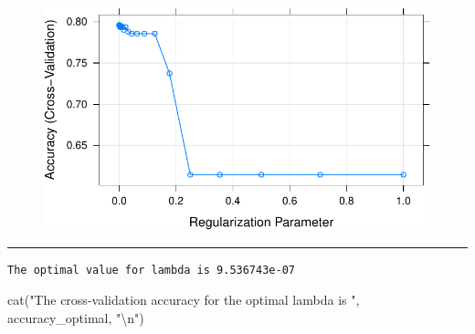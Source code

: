 \documentclass[
  letterpaper,
  DIV=11,
  numbers=noendperiod]{scrartcl}
\newenvironment{Shaded}{\begin{snugshade}}{\end{snugshade}}
\newcommand{\CommentTok}[1]{\textcolor[rgb]{0.37,0.37,0.37}{#1}}
\newcommand{\FunctionTok}[1]{\textcolor[rgb]{0.28,0.35,0.67}{#1}}
\newcommand{\NormalTok}[1]{\textcolor[rgb]{0.00,0.23,0.31}{#1}}
\newcommand{\OtherTok}[1]{\textcolor[rgb]{0.00,0.23,0.31}{#1}}
\newcommand{\SpecialCharTok}[1]{\textcolor[rgb]{0.37,0.37,0.37}{#1}}
\newcommand{\StringTok}[1]{\textcolor[rgb]{0.13,0.47,0.30}{#1}}
\begin{document}
\begin{figure}[H]

{\centering \includegraphics{index_files/figure-pdf/unnamed-chunk-17-1.pdf}

}

\end{figure}

\begin{center}\rule{0.5\linewidth}{0.5pt}\end{center}

\begin{Shaded}
\end{Shaded}

\begin{verbatim}
The optimal value for lambda is 9.536743e-07 
\end{verbatim}

\begin{Shaded}
\begin{Highlighting}[]
\FunctionTok{cat}\NormalTok{(}\StringTok{"The cross{-}validation accuracy for the optimal lambda is "}\NormalTok{, accuracy\_optimal, }\StringTok{"}\SpecialCharTok{\textbackslash{}n}\StringTok{"}\NormalTok{)}
\end{Highlighting}
\end{Shaded}
\end{document}
